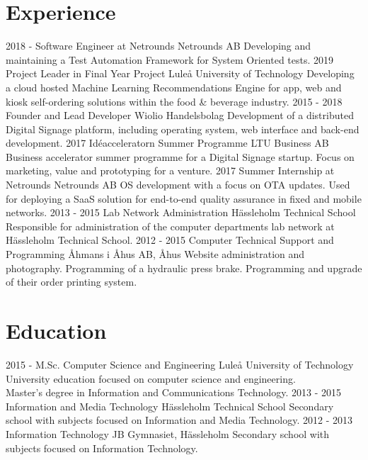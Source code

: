 \documentclass[]{friggeri-cv}
\begin{document}
\section{Experience}
\begin{entrylist}
    \entry
    {2018 -}
    {Software Engineer at Netrounds}
    {Netrounds AB}
    {Developing and maintaining a Test Automation Framework for System Oriented tests.}
    \entry
    {2019}
    {Project Leader in Final Year Project}
    {Luleå University of Technology}
    {Developing a cloud hosted Machine Learning Recommendations
    Engine for app, web and kiosk self-ordering solutions within the food \&
    beverage industry.}
    \entry
    {2015 - 2018}
    {Founder and Lead Developer}
    {Wiolio Handelsbolag}
    {Development of a distributed Digital Signage platform, including operating system, web interface and back-end development.}
    \entry
    {2017}
    {Idéacceleratorn Summer Programme}
    {LTU Business AB}
    {Business accelerator summer programme for a Digital Signage startup. Focus on marketing, value and prototyping for a venture.}
    \entry
    {2017}
    {Summer Internship at Netrounds}
    {Netrounds AB}
    {OS development with a focus on OTA updates. Used for deploying a SaaS solution for end-to-end quality assurance in fixed and mobile networks.}
    \entry
    {2013 - 2015}
    {Lab Network Administration}
    {Hässleholm Technical School}
    {Responsible for administration of the computer departments lab network at Hässleholm Technical School.}
    \entry
    {2012 - 2015}
    {Computer Technical Support and Programming}
    {Åhmans i Åhus AB, Åhus}
    {Website administration and photography. Programming of a hydraulic press
    brake. Programming and upgrade of their order printing system.\\}
\end{entrylist}

\section{Education}
\begin{entrylist}
  \entry
    {2015 -}
    {M.Sc. Computer Science and Engineering}
    {Luleå University of Technology}
    {University education focused on computer science and engineering. \\
    Master's degree in Information and Communications Technology.}
  \entry
    {2013 - 2015}
    {Information and Media Technology}
    {Hässleholm Technical School}
    {Secondary school with subjects focused on Information and Media Technology.}
  \entry
    {2012 - 2013}
    {Information Technology}
    {JB Gymnasiet, Hässleholm}
    {Secondary school with subjects focused on Information Technology.}
\end{entrylist}
\end{document}
